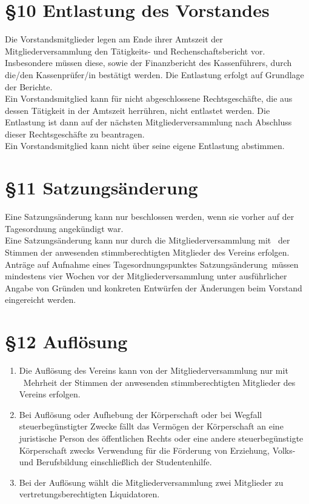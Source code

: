 \documentclass[ngerman]{article}
\begin{document}
\section*{§10 Entlastung des Vorstandes}
Die Vorstandsmitglieder legen am Ende ihrer Amtszeit der Mitgliederversammlung den Tätigkeits- und Rechenschaftsbericht vor.
Insbesondere müssen diese, sowie der Finanzbericht des Kassenführers, durch die/den Kassenprüfer/in bestätigt werden.
Die Entlastung erfolgt auf Grundlage der Berichte.\\
Ein Vorstandsmitglied kann für nicht abgeschlossene Rechtsgeschäfte, die aus dessen Tätigkeit in der Amtszeit herrühren, nicht entlastet werden. Die Entlastung ist dann auf der nächsten Mitgliederversammlung nach Abschluss dieser Rechtsgeschäfte zu beantragen.\\
Ein Vorstandsmitglied kann nicht über seine eigene Entlastung abstimmen.

\section*{§11 Satzungsänderung}
Eine Satzungsänderung kann nur beschlossen werden, wenn sie vorher auf der Tagesordnung angekündigt war.\\
Eine Satzungsänderung kann nur durch die Mitgliederversammlung mit \ der Stimmen der anwesenden stimmberechtigten Mitglieder des Vereins erfolgen.\\
Anträge auf Aufnahme eines Tagesordnungspunktes \glqq Satzungsänderung\grqq\ müssen mindestens vier Wochen vor der Mitgliederversammlung unter ausführlicher Angabe von Gründen und konkreten Entwürfen der Änderungen beim Vorstand eingereicht werden.


\section*{§12 Auflösung}
\begin{enumerate}
 \item Die Auflösung des Vereins kann von der Mitgliederversammlung nur mit \ Mehrheit der Stimmen der anwesenden stimmberechtigten Mitglieder des Vereins erfolgen.
 \item Bei Auflösung oder Aufhebung der Körperschaft oder bei Wegfall steuerbegünstigter Zwecke fällt das Vermögen der Körperschaft an eine juristische Person des öffentlichen Rechts oder eine andere steuerbegünstigte Körperschaft zwecks Verwendung für die Förderung von Erziehung, Volks- und Berufsbildung einschließlich der Studentenhilfe.
 \item Bei der Auflösung wählt die Mitgliederversammlung zwei Mitglieder zu vertretungsberechtigten Liquidatoren.
\end{enumerate}
\end{document}
